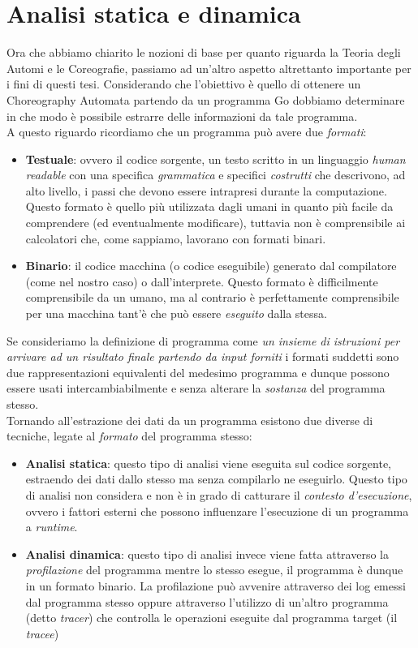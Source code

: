\section{Analisi statica e dinamica}
Ora che abbiamo chiarito le nozioni di base per quanto riguarda la Teoria degli Automi e le Coreografie, passiamo ad un'altro aspetto altrettanto importante per i fini di questi tesi. Considerando che l'obiettivo è quello di ottenere un Choreography Automata partendo da un programma Go dobbiamo determinare in che modo è possibile estrarre delle informazioni da tale programma.\\
A questo riguardo ricordiamo che un programma può avere due \emph{formati}:
\begin{itemize}
    \item \textbf{Testuale}: ovvero il codice sorgente, un testo scritto in un linguaggio \emph{human readable} con una specifica \emph{grammatica} e specifici \emph{costrutti} che descrivono, ad alto livello, i passi che devono essere intrapresi durante la computazione. Questo formato è quello più utilizzata dagli umani in quanto più facile da comprendere (ed eventualmente modificare), tuttavia non è comprensibile ai calcolatori che, come sappiamo, lavorano con formati binari.
    \item \textbf{Binario}: il codice macchina (o codice eseguibile) generato dal compilatore (come nel nostro caso) o dall'interprete. Questo formato è difficilmente comprensibile da un umano, ma al contrario è perfettamente comprensibile per una macchina tant'è che può essere \emph{eseguito} dalla stessa.
\end{itemize}
Se consideriamo la definizione di programma come \emph{un insieme di istruzioni per arrivare ad un risultato finale partendo da input forniti} i formati suddetti sono due rappresentazioni equivalenti del medesimo programma e dunque possono essere usati intercambiabilmente e senza alterare la \emph{sostanza} del programma stesso. \bigskip \\
Tornando all'estrazione dei dati da un programma esistono due diverse di tecniche, legate al \emph{formato} del programma stesso:
\begin{itemize}
    \item \textbf{Analisi statica}\cite{Static_Analysis}: questo tipo di analisi viene eseguita sul codice sorgente, estraendo dei dati dallo stesso ma senza compilarlo ne eseguirlo. Questo tipo di analisi non considera e non è in grado di catturare il \emph{contesto d'esecuzione}, ovvero i fattori esterni che possono influenzare l'esecuzione di un programma a \emph{runtime}.
    \item \textbf{Analisi dinamica}\cite{Dynamic_Analysis}: questo tipo di analisi invece viene fatta attraverso la \emph{profilazione} del programma mentre lo stesso esegue, il programma è dunque in un formato binario. La profilazione può avvenire attraverso dei log emessi dal programma stesso oppure attraverso l'utilizzo di un'altro programma (detto \emph{tracer}) che controlla le operazioni eseguite dal programma target (il \emph{tracee})
\end{itemize}
